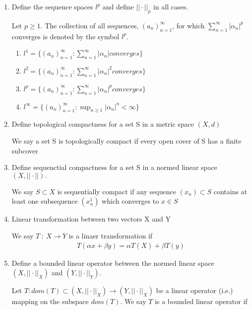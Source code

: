 \documentclass[11pt]{SelfArxOneColBMN}
\begin{document}
\begin{enumerate}
  \item Define the sequence spaces $l^p$ and define $||\cdot||_p$ in all cases.
  \begin{solution}
    Let $p \geq 1$. The collection of all sequences, $(a_n)^{\infty}_{n=1}$, for which $\sum_{n=1}^{\infty}|\alpha_n|^p$ converges is denoted by the symbol $l^p$.
    \begin{enumerate}
      \item $l^1 = \{(a_n)_{n=1}^{\infty} : \sum_{n=1}^{\infty}|\alpha_n| converges\}$
      \item $l^2 = \{(a_n)_{n=1}^{\infty} : \sum_{n=1}^{\infty}|\alpha_n|^2 converges\}$
      \item $l^p = \{(a_n)_{n=1}^{\infty} : \sum_{n=1}^{\infty}|\alpha_n|^p converges\}$
      \item $l^\infty = \{(a_n)_{n=1}^{\infty} : \sup_{n\geq1}|\alpha_n|^n < \infty\}$
    \end{enumerate}
  \end{solution}
  \item Define topological compactness for a set S in a metric space $(X,d)$
  \begin{solution}
    We say a set S is topologically compact if every open cover of S has a finite subcover
  \end{solution}
  \item Define sequenctial compactness for a set S in a normed linear space $(X,||\cdot||).$
  \begin{solution}
    We say $S \subset X$ is sequentially compact if any sequence $(x_n) \subset S$ contains at least one subsequence $(x_n^1)$ which converges to $x \in S$
  \end{solution}
  \item Linear transformation between two vectors X and Y
  \begin{solution}
    We say $T\: : \: X \rightarrow Y$ is a linaer transformation if
    \begin{eqnarray*}
      T(\alpha x + \beta y) = \alpha T(X) + \beta T(y)
    \end{eqnarray*}
  \end{solution}
  \item Define a bounded linear operator between the normed linear space $(X,||\cdot||_X)$ and $(Y,||\cdot||_Y)$.
  \begin{solution}
    Let $T: dom(T) \subset (X,||\cdot||_X) \rightarrow (Y,||\cdot||_X)$ be a linear operator (i.e.) mapping on the subspace $dom(T)$. We say $T$ is a bounded linear operator if

\end{solution}
\end{enumerate}
\end{document}
